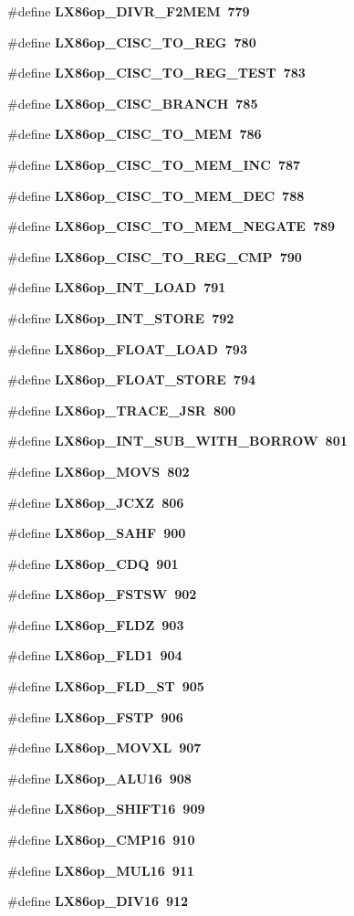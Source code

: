 \begin{CompactItemize}
\#define \bf{LX86op\_\-DIVR\_\-F2MEM}~779
\item 
\#define \bf{LX86op\_\-CISC\_\-TO\_\-REG}~780
\item 
\#define \bf{LX86op\_\-CISC\_\-TO\_\-REG\_\-TEST}~783
\item 
\#define \bf{LX86op\_\-CISC\_\-BRANCH}~785
\item 
\#define \bf{LX86op\_\-CISC\_\-TO\_\-MEM}~786
\item 
\#define \bf{LX86op\_\-CISC\_\-TO\_\-MEM\_\-INC}~787
\item 
\#define \bf{LX86op\_\-CISC\_\-TO\_\-MEM\_\-DEC}~788
\item 
\#define \bf{LX86op\_\-CISC\_\-TO\_\-MEM\_\-NEGATE}~789
\item 
\#define \bf{LX86op\_\-CISC\_\-TO\_\-REG\_\-CMP}~790
\item 
\#define \bf{LX86op\_\-INT\_\-LOAD}~791
\item 
\#define \bf{LX86op\_\-INT\_\-STORE}~792
\item 
\#define \bf{LX86op\_\-FLOAT\_\-LOAD}~793
\item 
\#define \bf{LX86op\_\-FLOAT\_\-STORE}~794
\item 
\#define \bf{LX86op\_\-TRACE\_\-JSR}~800
\item 
\#define \bf{LX86op\_\-INT\_\-SUB\_\-WITH\_\-BORROW}~801
\item 
\#define \bf{LX86op\_\-MOVS}~802
\item 
\#define \bf{LX86op\_\-JCXZ}~806
\item 
\#define \bf{LX86op\_\-SAHF}~900
\item 
\#define \bf{LX86op\_\-CDQ}~901
\item 
\#define \bf{LX86op\_\-FSTSW}~902
\item 
\#define \bf{LX86op\_\-FLDZ}~903
\item 
\#define \bf{LX86op\_\-FLD1}~904
\item 
\#define \bf{LX86op\_\-FLD\_\-ST}~905
\item 
\#define \bf{LX86op\_\-FSTP}~906
\item 
\#define \bf{LX86op\_\-MOVXL}~907
\item 
\#define \bf{LX86op\_\-ALU16}~908
\item 
\#define \bf{LX86op\_\-SHIFT16}~909
\item 
\#define \bf{LX86op\_\-CMP16}~910
\item 
\#define \bf{LX86op\_\-MUL16}~911
\item 
\#define \bf{LX86op\_\-DIV16}~912
\item 

\end{CompactItemize}
